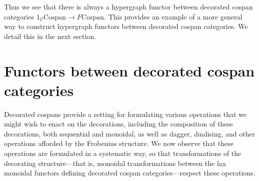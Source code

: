 Thus we see that there is always a hypergraph functor between decorated cospan
categories $1_{\mathcal C}\mathrm{Cospan} \rightarrow F\mathrm{Cospan}$. This
provides an example of a more general way to construct hypergraph functors
between decorated cospan categories. We detail this in the next section.

\section{Functors between decorated cospan categories} \label{sec:dcf}

Decorated cospans provide a setting for formulating various operations that we
might wish to enact on the decorations, including the composition of these
decorations, both sequential and monoidal, as well as dagger, dualising, and
other operations afforded by the Frobenius structure. We now observe that these
operations are formulated in a systematic way, so that transformations of the
decorating structure---that is, monoidal transformations between the lax
monoidal functors defining decorated cospan categories---respect these
operations. 

